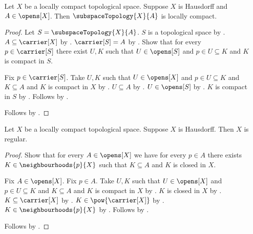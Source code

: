 \begin{theorem}\label{open_subspace_of_locally_compact_hausdorff_is_locally_compact}
    Let $X$ be a locally compact topological space.
    Suppose $X$ is Hausdorff and $A\in\opens[X]$.
    Then $\subspaceTopology{X}{A}$ is locally compact.
\end{theorem}
\begin{proof}
    Let $S=\subspaceTopology{X}{A}$.
    $S$ is a topological space by .
    $A\subseteq\carrier[X]$ by .
    $\carrier[S]=A$ by .
    Show that for every $p\in\carrier[S]$ there exist $U,K$ such that
        $U\in\opens[S]$ and $p\in U\subseteq K$ and $K$ is compact in $S$.
    \begin{subproof}
        Fix $p\in\carrier[S]$.
        Take $U,K$ such that $U\in\opens[X]$ and $p\in U\subseteq K$ and
            $K\subseteq A$ and $K$ is compact in $X$ by
            .
        $U\subseteq A$ by .
        $U\in\opens[S]$ by .
        $K$ is compact in $S$ by .
        Follows by \auto.
    \end{subproof}
    Follows by .
\end{proof}

\begin{theorem}\label{locally_compact_hausdorff_is_regular}
    Let $X$ be a locally compact topological space.
    Suppose $X$ is Hausdorff.
    Then $X$ is regular.
\end{theorem}
\begin{proof}
    Show that for every $A\in\opens[X]$ we have for every $p\in A$
        there exists $K\in\neighbourhoods{p}{X}$ such that
            $K\subseteq A$ and $K$ is closed in $X$.
    \begin{subproof}
        Fix $A\in\opens[X]$.
        Fix $p\in A$.
        Take $U,K$ such that $U\in\opens[X]$ and $p\in U\subseteq K$ and
            $K\subseteq A$ and $K$ is compact in $X$ by
            .
        $K$ is closed in $X$ by .
        $K\subseteq\carrier[X]$ by .
        $K\in\pow{\carrier[X]}$ by .
        $K\in\neighbourhoods{p}{X}$ by .
        Follows by \auto.
    \end{subproof}
    Follows by .
\end{proof}
